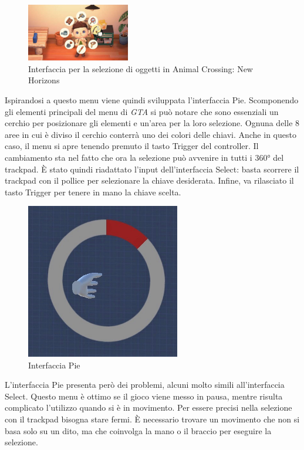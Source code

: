\documentclass[target=bach,aauheader=]{thud}
\begin{document}
\begin{figure}[h]
    \centering
    \includegraphics[width=0.40\textwidth]{nh}
    \caption{Interfaccia per la selezione di oggetti in Animal Crossing: New Horizons}
    \label{fig:nh}
\end{figure}

Ispirandosi a questo menu viene quindi sviluppata l'interfaccia Pie.
Scomponendo gli elementi principali del menu di \textit{GTA} si può notare che sono essenziali un cerchio per posizionare gli elementi e un'area per la loro selezione.
Ognuna delle 8 aree in cui è diviso il cerchio conterrà uno dei colori delle chiavi.
Anche in questo caso, il menu si apre tenendo premuto il tasto Trigger del controller.
Il cambiamento sta nel fatto che ora la selezione può avvenire in tutti i 360° del trackpad.
È stato quindi riadattato l'input dell'interfaccia Select: basta scorrere il trackpad con il pollice per selezionare la chiave desiderata.
Infine, va rilasciato il tasto Trigger per tenere in mano la chiave scelta.

\begin{figure}[h]
    \centering
    \includegraphics[width=0.60\textwidth]{pie}
    \caption{Interfaccia Pie}
    \label{fig:pie}
\end{figure}

L'interfaccia Pie presenta però dei problemi, alcuni molto simili all'interfaccia Select.
Questo menu è ottimo se il gioco viene messo in pausa, mentre risulta complicato l'utilizzo quando si è in movimento.
Per essere precisi nella selezione con il trackpad bisogna stare fermi.
È necessario trovare un movimento che non si basa solo su un dito, ma che coinvolga la mano o il braccio per eseguire la selezione. 
\end{document}
